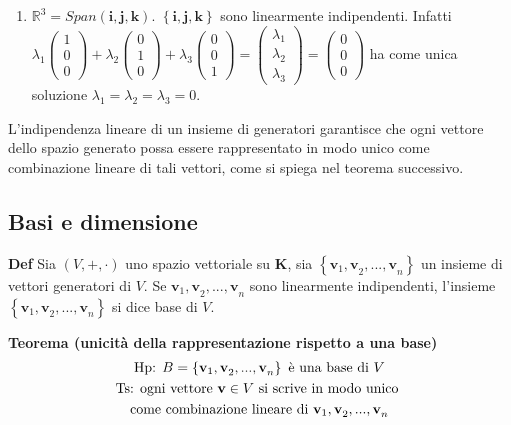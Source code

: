\documentclass{article}
\begin{document}
\begin{enumerate}
\item $%
\mathbb{R}
^{3}=Span\left( \mathbf{i,j,k}\right) $. $\left\{ \mathbf{i,j,k}\right\} $
sono linearmente indipendenti. Infatti $\lambda _{1}\left( 
\begin{array}{c}
1 \\ 
0 \\ 
0%
\end{array}%
\right) +\lambda _{2}\left( 
\begin{array}{c}
0 \\ 
1 \\ 
0%
\end{array}%
\right) +\lambda _{3}\left( 
\begin{array}{c}
0 \\ 
0 \\ 
1%
\end{array}%
\right) =\left( 
\begin{array}{c}
\lambda _{1} \\ 
\lambda _{2} \\ 
\lambda _{3}%
\end{array}%
\right) =\left( 
\begin{array}{c}
0 \\ 
0 \\ 
0%
\end{array}%
\right) $ ha come unica soluzione $\lambda _{1}=\lambda _{2}=\lambda _{3}=0$.
\end{enumerate}

L'indipendenza lineare di un insieme di generatori garantisce che ogni
vettore dello spazio generato possa essere rappresentato in modo unico come
combinazione lineare di tali vettori, come si spiega nel teorema successivo.

\subsection{Basi e dimensione}

\textbf{Def} Sia $\left( V,+,\cdot \right) $ uno spazio vettoriale su $%
\mathbf{K}$, sia $\left\{ \mathbf{v}_{1}\mathbf{,v}_{2}\mathbf{,...,v}%
_{n}\right\} $ un insieme di vettori generatori di $V$. Se $\mathbf{v}_{1}%
\mathbf{,v}_{2}\mathbf{,...,v}_{n}$ sono linearmente indipendenti, l'insieme 
$\left\{ \mathbf{v}_{1}\mathbf{,v}_{2}\mathbf{,...,v}_{n}\right\} $ si dice
base di $V$.

\textbf{Teorema (unicit\`{a} della rappresentazione rispetto a una base)}%
\begin{gather*}
\text{Hp}\text{: }B=\left\{ \mathbf{v}_{1}\mathbf{,v}_{2}\mathbf{,...,v}%
_{n}\right\} \text{ \`{e} una base di }V \\
\text{Ts}\text{: ogni vettore }\mathbf{v}\in V\text{ si scrive in modo unico 
} \\
\text{come combinazione lineare di }\mathbf{v}_{1}\mathbf{,v}_{2}\mathbf{%
,...,v}_{n}
\end{gather*}
\end{document}
